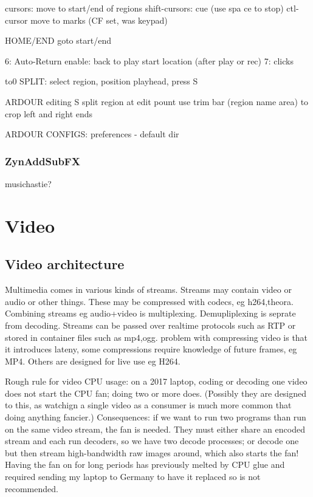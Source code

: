 \documentclass[oneside,english]{scrbook}
\begin{document}
cursors: 	move to start/end of regions
shift-cursors: 	cue (use spa  ce to stop)
ctl-cursor 	move to marks (CF set, was keypad)

HOME/END goto start/end

6: Auto-Return enable: back to play start location (after play or rec)
7: clicks

to0 SPLIT: select region, position playhead, press S


ARDOUR editing
	S split region at edit pount
	use trim bar (region name area) to crop left and right ends

ARDOUR CONFIGS:
	preferences - default dir

\section{ZynAddSubFX}

musichastie?


\part{Video}


\chapter{Video architecture}

Multimedia comes in various kinds of streams. Streams may contain
video or audio or other things. These may be compressed with codecs,
eg h264,theora. Combining streams eg audio+video is multiplexing.
Demupliplexing is seprate from decoding. Streams can be passed over
realtime protocols such as RTP or stored in container files such as
mp4,ogg. problem with compressing video is that it introduces lateny,
some compressions require knowledge of future frames, eg MP4. Others
are designed for live use eg H264. 

Rough rule for video CPU usage: on a 2017 laptop, coding or decoding one video does not start the CPU fan; doing two or more does. (Possibly they are designed to this, as watchign a single video as a consumer is much more common that doing anything fancier.)  Consequences: if we want to run two programs than run on the same video stream, the fan is needed. They must either share an encoded stream and each run decoders, so we have two decode processes; or decode one but then stream high-bandwidth raw images around, which also starts the fan! Having the fan on for long periods has previously melted by CPU glue and required sending my laptop to Germany to have it replaced so is not recommended.
\end{document}

